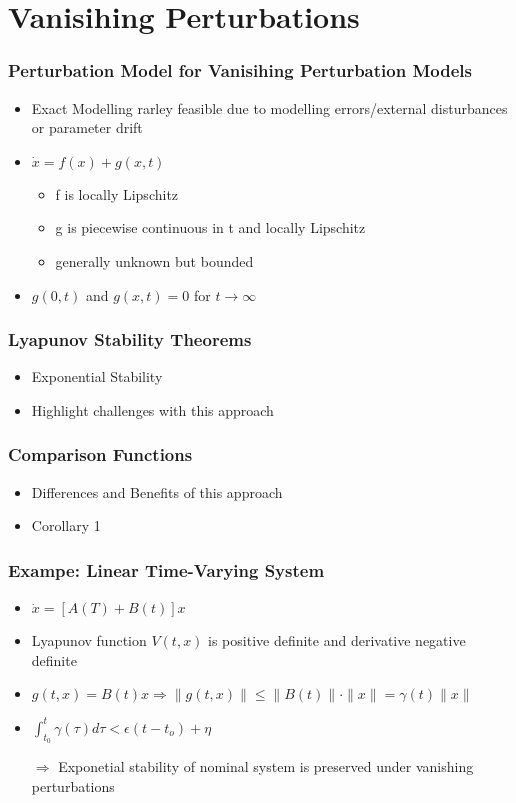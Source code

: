 \documentclass[student, noshadow, lsr, english, aspectratio=169]{ITR_LSR_slides}
\begin{document}
\section{Vanisihing Perturbations}
\begin{frame}
	\frametitle{Perturbation Model for Vanisihing Perturbation Models}
	\begin{itemize}
		\item Exact Modelling rarley feasible due to modelling errors/external disturbances or parameter drift
		\item $\dot{x}=f(x)+g(x,t)$
		\begin{itemize}
			\item f is locally Lipschitz
			\item g is piecewise continuous in t and locally Lipschitz
			\item generally unknown but bounded
		\end{itemize}
		\item $g(0,t)$ and $g(x,t)=0$ for $t\rightarrow\infty$
	\end{itemize}
\end{frame}


\begin{frame}
	\frametitle{Lyapunov Stability Theorems}
	\begin{itemize}
		\item Exponential Stability
		\item Highlight challenges with this approach
	\end{itemize}
\end{frame}

\begin{frame}
	\frametitle{Comparison Functions}
	\begin{itemize}
		\item Differences and Benefits of this approach
		\item Corollary 1
	\end{itemize}
\end{frame}

\begin{frame}
	\frametitle{Exampe: Linear Time-Varying System}
	\begin{itemize}
		\item $\dot{x}=[A(T)+B(t)]x$
		\item Lyapunov function $V(t,x)$ is positive definite and derivative negative definite
		\item $g(t,x) = B(t)x \Rightarrow \|g(t,x)\| \leq \|B(t)\| \cdot \|x\| = \gamma(t) \|x\|$
		\item $\int_{t_0}^{t}\gamma(\tau)d\tau<\epsilon(t-t_o)+\eta$
		\item[$\Rightarrow$] Exponetial stability of nominal system is preserved under vanishing perturbations
	\end{itemize}
\end{frame}
\end{document}
